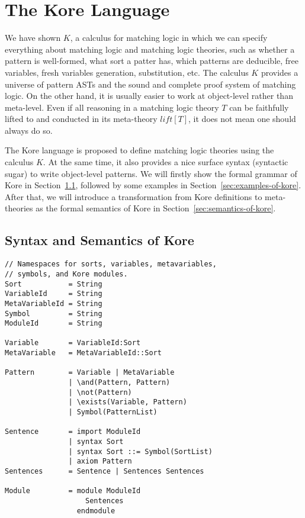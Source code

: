\documentclass[UTF8]{article}
\theoremstyle{plain}
\theoremstyle{definition}
\theoremstyle{remark}
\begin{document}
\section{The Kore Language}

We have shown $K$, a calculus for matching logic in which we can specify 
everything about matching logic and matching logic theories, such as 
whether a pattern is well-formed, what sort a patter has, which patterns are 
deducible, free variables, fresh variables generation, substitution, etc.
The calculus $K$ provides a universe of pattern ASTs and the sound and complete 
proof system of matching logic. 
On the other hand, it is usually easier to work at object-level rather than 
meta-level. 
Even if all reasoning in a matching logic theory $T$ can be faithfully lifted 
to and conducted in its meta-theory $\mathit{lift}[T]$, it does not mean one 
should always do so. 

The Kore language is proposed to define matching logic theories using the 
calculus $K$. 
At the same time, it also provides a nice surface syntax 
(syntactic sugar) to write object-level patterns. 
We will firstly show the formal grammar of Kore in 
Section~\ref{sec:syntax-of-kore}, followed by some examples in 
Section~\ref{sec:examples-of-kore}.
After that, we will introduce a transformation from Kore definitions to 
meta-theories as the formal semantics of Kore in 
Section~\ref{sec:semantics-of-kore}.

\subsection{Syntax and Semantics of Kore}
\label{sec:syntax-of-kore}

\begin{Verbatim}[fontsize=\small]
// Namespaces for sorts, variables, metavariables,
// symbols, and Kore modules.
Sort           = String
VariableId     = String
MetaVariableId = String
Symbol         = String
ModuleId       = String

Variable       = VariableId:Sort
MetaVariable   = MetaVariableId::Sort

Pattern        = Variable | MetaVariable
               | \and(Pattern, Pattern)
               | \not(Pattern)
               | \exists(Variable, Pattern)
               | Symbol(PatternList)

Sentence       = import ModuleId
               | syntax Sort
               | syntax Sort ::= Symbol(SortList)
               | axiom Pattern
Sentences      = Sentence | Sentences Sentences

Module         = module ModuleId
                   Sentences
                 endmodule
\end{Verbatim}
\end{document}
